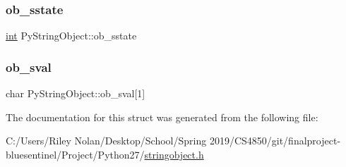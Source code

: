 \subsubsection{\texorpdfstring{ob\_sstate}{ob\_sstate}}
{\footnotesize\ttfamily \mbox{\hyperlink{warnings_8h_a74f207b5aa4ba51c3a2ad59b219a423b}{int}} Py\+String\+Object\+::ob\+\_\+sstate}

\mbox{\label{struct_py_string_object_aa8286d87404dd10caf82bcd4835116d6}} 
\subsubsection{\texorpdfstring{ob\_sval}{ob\_sval}}
{\footnotesize\ttfamily char Py\+String\+Object\+::ob\+\_\+sval\mbox{[}1\mbox{]}}



The documentation for this struct was generated from the following file\+:\begin{DoxyCompactItemize}
\item 
C\+:/\+Users/\+Riley Nolan/\+Desktop/\+School/\+Spring 2019/\+C\+S4850/git/finalproject-\/bluesentinel/\+Project/\+Python27/\mbox{\hyperlink{stringobject_8h}{stringobject.\+h}}\end{DoxyCompactItemize}

